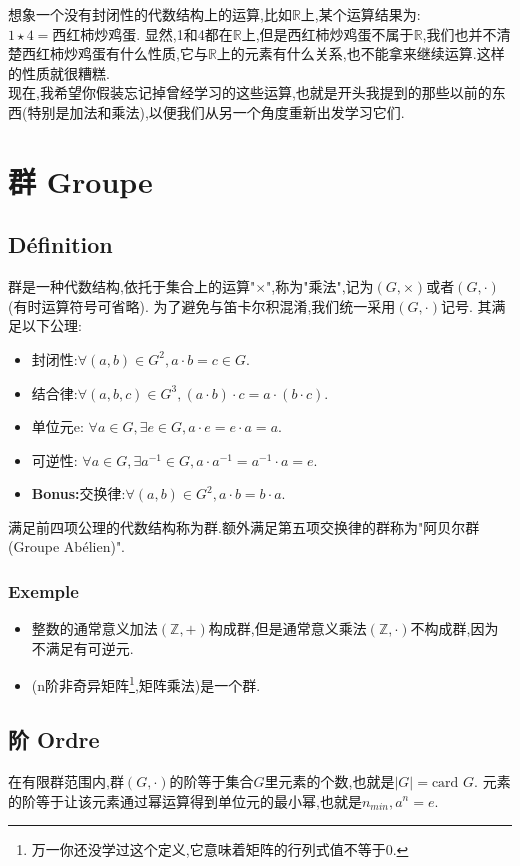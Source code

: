 \documentclass[12pt, a4paper, oneside]{ctexbook}
\newcommand{\R }{\mathbb{R}}%
\begin{document}
  想象一个没有封闭性的代数结构上的运算,比如$\R$上,某个运算结果为:$1\star 4=\text{西红柿炒鸡蛋}$.
  显然,1和4都在$\R$上,但是西红柿炒鸡蛋不属于$\R$,我们也并不清楚西红柿炒鸡蛋有什么性质,它与$\R$上的元素有什么关系,也不能拿来继续运算.这样的性质就很糟糕.\\
  
  现在,我希望你假装忘记掉曾经学习的这些运算,也就是开头我提到的那些以前的东西(特别是加法和乘法),以便我们从另一个角度重新出发学习它们.

\section{群 Groupe}
  \subsection{Définition}
  群是一种代数结构,依托于集合上的运算"$\times$",称为"乘法",记为$(G,\times)$或者$(G,\cdot)$(有时运算符号可省略).
  为了避免与笛卡尔积混淆,我们统一采用$(G,\cdot)$记号.
  其满足以下公理:
  \begin{itemize}
    \item 封闭性:$\forall(a,b)\in G^2,a\cdot b=c\in G $.
    \item 结合律:$\forall(a,b,c)\in G^3,(a\cdot b)\cdot c=a\cdot (b\cdot c) $.
    \item 单位元e: $\forall a\in G, \exists e\in G, a\cdot e=e\cdot a=a$.
    \item 可逆性:  $\forall a\in G, \exists a^{-1}\in G, a\cdot a^{-1}=a^{-1}\cdot a=e$.
    \item \textbf{Bonus:}交换律:$\forall(a,b)\in G^2,a\cdot b=b\cdot a $.
  \end{itemize}
  满足前四项公理的代数结构称为群.额外满足第五项交换律的群称为"阿贝尔群(Groupe Abélien)".
  \subsubsection{Exemple}
  \begin{itemize}
    \item 整数的通常意义加法$(\mathbb{Z},+) $构成群,但是通常意义乘法$(\mathbb{Z},\cdot) $不构成群,因为不满足有可逆元.
    \item (n阶非奇异矩阵\footnote{万一你还没学过这个定义,它意味着矩阵的行列式值不等于0.},矩阵乘法)是一个群.



  \end{itemize}
  \subsection{阶 Ordre}
  在有限群范围内,群$(G,\cdot)$的阶等于集合$G$里元素的个数,也就是$|G|=\text{card }G$.
  元素的阶等于让该元素通过幂运算得到单位元的最小幂,也就是$n_{min},a^n=e$.
\end{document}
